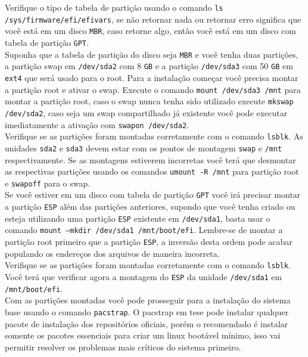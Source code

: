 \documentclass[12pt,a4paper]{article}
\begin{document}
Verifique o tipo de tabela de partição usando o comando \texttt{ls /sys/firmware/efi/efivars}, se não retornar nada ou retornar erro significa que você está em um disco \texttt{MBR}, caso retorne algo, então você está em um disco com tabela de partição \texttt{GPT}.\\

Suponha que a tabela de partição do disco seja \texttt{MBR} e você tenha duas partições, a partição swap em \texttt{/dev/sda2} com 8 \texttt{GB} e a partição \texttt{/dev/sda3} com 50 \texttt{GB} em \texttt{ext4} que será usado para o root. Para a instalação começar você precisa montar a partição root e ativar o swap. Execute o comando \texttt{mount /dev/sda3 /mnt} para montar a partição root, caso o swap nunca tenha sido utilizado execute \texttt{mkswap /dev/sda2}, caso seja um swap compartilhado já existente você pode executar imediatamente a ativação com \texttt{swapon /dev/sda2}. \\

Verifique se as partições foram montadas corretamente com o comando \texttt{lsblk}. As unidades \texttt{sda2} e \texttt{sda3} devem estar com os pontos de montagem \texttt{swap} e \texttt{/mnt} respectivamente. Se as montagens estiverem incorretas você terá que desmontar as respectivas partições usando os comandos \texttt{umount -R /mnt} para partição root e \texttt{swapoff} para o swap. \\

Se você estiver em um disco com tabela de partição \texttt{GPT} você irá precisar montar a partição \texttt{ESP} além das partições anteriores, supondo que você tenha criado ou esteja utilizando uma partição \texttt{ESP} existente em \texttt{/dev/sda1}, basta usar o comando \texttt{mount --mkdir /dev/sda1 /mnt/boot/efi}. Lembre-se de montar a partição root primeiro que a partição \texttt{ESP}, a inversão desta ordem pode acabar populando os endereços dos arquivos de maneira incorreta. \\

Verifique se as partições foram montadas corretamente com o comando \texttt{lsblk}. Você terá que verificar agora a montagem do \texttt{ESP} da unidade \texttt{/dev/sda1} em \texttt{/mnt/boot/efi}. \\

Com as partições montadas você pode prosseguir para a instalação do sistema base usando o comando \texttt{pacstrap}. O pacstrap em tese pode instalar qualquer pacote de instalação dos repositórios oficiais, porém o recomendado é instalar somente os pacotes essenciais para criar um linux bootável mínimo, isso vai permitir resolver os problemas mais críticos do sistema primeiro. \\
\end{document}
